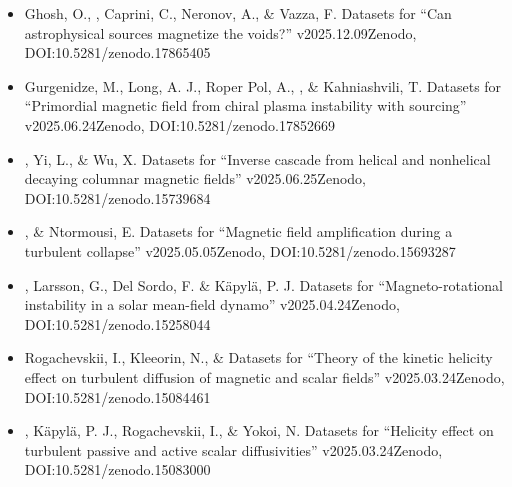 \begin{itemize}
\item[{63.}~]
Ghosh, O., \Brandenburg, Caprini, C., Neronov, A., \& Vazza, F.
{Datasets for ``Can astrophysical sources magnetize the voids?'' v2025.12.09}{Zenodo, DOI:10.5281/zenodo.17865405}

\item[{62.}~]
Gurgenidze, M., Long, A. J., Roper Pol, A., \Brandenburg, \& Kahniashvili, T.
{Datasets for ``Primordial magnetic field from chiral plasma instability with sourcing'' v2025.06.24}{Zenodo, DOI:10.5281/zenodo.17852669}

\item[{61.}~]
\Brandenburg, Yi, L., \& Wu, X.
{Datasets for ``Inverse cascade from helical and nonhelical decaying columnar magnetic fields'' v2025.06.25}{Zenodo, DOI:10.5281/zenodo.15739684}

\item[{60.}~]
\Brandenburg, \& Ntormousi, E.
{Datasets for ``Magnetic field amplification during a turbulent collapse'' v2025.05.05}{Zenodo, DOI:10.5281/zenodo.15693287}

\item[{59.}~]
\Brandenburg, Larsson, G., Del Sordo, F. \& K\"apyl\"a, P. J.
{Datasets for ``Magneto-rotational instability in a solar mean-field dynamo'' v2025.04.24}{Zenodo, DOI:10.5281/zenodo.15258044}

\item[{58.}~]
Rogachevskii, I., Kleeorin, N., \& \Brandenburg{}
{Datasets for ``Theory of the kinetic helicity effect on turbulent diffusion of magnetic and scalar fields'' v2025.03.24}{Zenodo, DOI:10.5281/zenodo.15084461}

\item[{57.}~]
\Brandenburg, K\"apyl\"a, P. J., Rogachevskii, I., \& Yokoi, N.
{Datasets for ``Helicity effect on turbulent passive and active scalar diffusivities'' v2025.03.24}{Zenodo, DOI:10.5281/zenodo.15083000}


\end{itemize}
